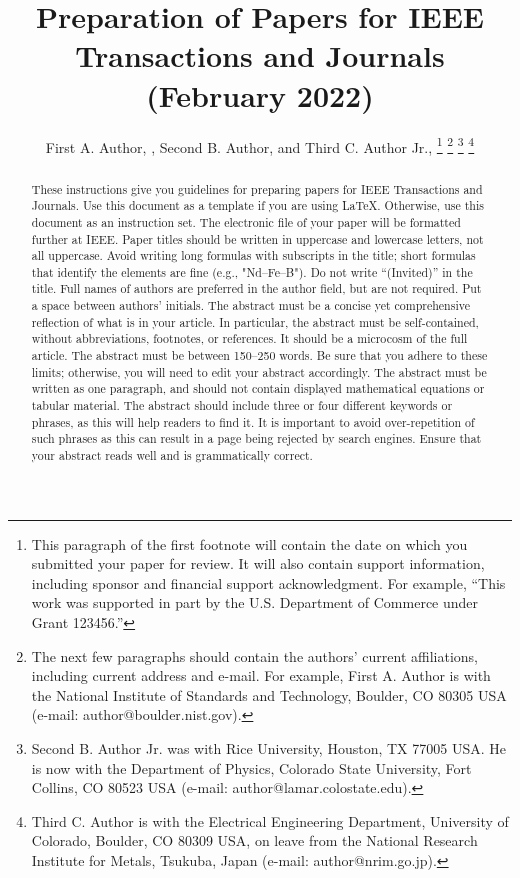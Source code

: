 \documentclass[journal,onecolumn,web]{ieeecolor}
\begin{document}
\title{Preparation of Papers for IEEE Transactions and Journals (February 2022)}
\author{First A. Author, , Second B. Author, and Third C. Author Jr., 
\thanks{This paragraph of the first footnote will contain the date on 
which you submitted your paper for review. It will also contain support 
information, including sponsor and financial support acknowledgment. For 
example, ``This work was supported in part by the U.S. Department of 
Commerce under Grant 123456.'' }
\thanks{The next few paragraphs should contain 
the authors' current affiliations, including current address and e-mail. For 
example, First A. Author is with the National Institute of Standards and 
Technology, Boulder, CO 80305 USA (e-mail: author@boulder.nist.gov). }
\thanks{Second B. Author Jr. was with Rice University, Houston, TX 77005 USA. He is 
now with the Department of Physics, Colorado State University, Fort Collins, 
CO 80523 USA (e-mail: author@lamar.colostate.edu).}
\thanks{Third C. Author is with 
the Electrical Engineering Department, University of Colorado, Boulder, CO 
80309 USA, on leave from the National Research Institute for Metals, 
Tsukuba, Japan (e-mail: author@nrim.go.jp).}}

\maketitle

\begin{abstract}
These instructions give you guidelines for preparing papers for 
IEEE Transactions and Journals. Use this document as a template if you are 
using \LaTeX. Otherwise, use this document as an 
instruction set. The electronic file of your paper will be formatted further 
at IEEE. Paper titles should be written in uppercase and lowercase letters, 
not all uppercase. Avoid writing long formulas with subscripts in the title; 
short formulas that identify the elements are fine (e.g., "Nd--Fe--B"). Do 
not write ``(Invited)'' in the title. Full names of authors are preferred in 
the author field, but are not required. Put a space between authors' 
initials. The abstract must be a concise yet comprehensive reflection of 
what is in your article. In particular, the abstract must be self-contained, 
without abbreviations, footnotes, or references. It should be a microcosm of 
the full article. The abstract must be between 150--250 words. Be sure that 
you adhere to these limits; otherwise, you will need to edit your abstract 
accordingly. The abstract must be written as one paragraph, and should not 
contain displayed mathematical equations or tabular material. The abstract 
should include three or four different keywords or phrases, as this will 
help readers to find it. It is important to avoid over-repetition of such 
phrases as this can result in a page being rejected by search engines. 
Ensure that your abstract reads well and is grammatically correct.
\end{abstract}
\end{document}
